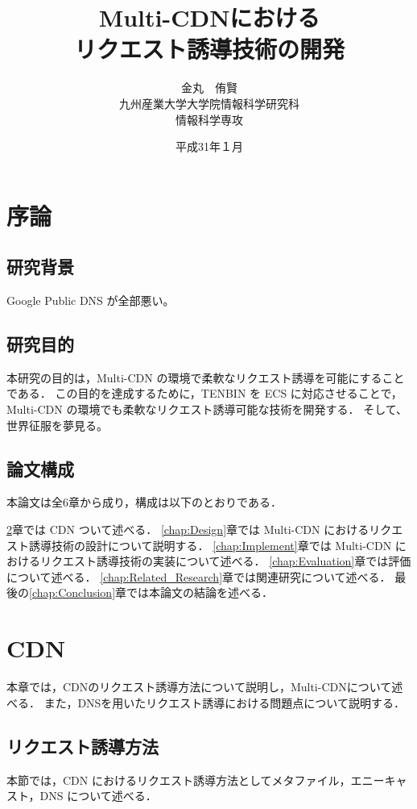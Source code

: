 \documentclass[a4j,12pt,onecolumn,oneside,titlepage,openany,final]{jreport}
\title{
 \Huge{Multi-CDNにおける}\\
 \Huge{リクエスト誘導技術の開発}
 \vspace{5.5cm}\\
}
\author{\LARGE{金丸　侑賢}\vspace{2cm}\\
\LARGE{九州産業大学大学院情報科学研究科}\vspace{0.5cm}\\
\LARGE{情報科学専攻}\vspace{1cm}\\
}
\date{\LARGE{平成31年１月}}
\begin{document}
\maketitle
\tableofcontents
\listoffigures
\listoftables

\chapter{序論}\label{chap:Prologue}

\section{研究背景}
Google Public DNS が全部悪い。
 
\section{研究目的}
本研究の目的は，Multi-CDN の環境で柔軟なリクエスト誘導を可能にすることである．
この目的を達成するために，TENBIN を ECS に対応させることで，Multi-CDN の環境でも柔軟なリクエスト誘導可能な技術を開発する．
そして、世界征服を夢見る。

\section{論文構成}
 本論文は全6章から成り，構成は以下のとおりである．
   
 \ref{chap:CDN}章では CDN ついて述べる．
 \ref{chap:Design}章では Multi-CDN におけるリクエスト誘導技術の設計について説明する．
 \ref{chap:Implement}章では Multi-CDN におけるリクエスト誘導技術の実装について述べる．
 \ref{chap:Evaluation}章では評価について述べる．
 \ref{chap:Related_Research}章では関連研究について述べる．
 最後の\ref{chap:Conclusion}章では本論文の結論を述べる．


\chapter{CDN}\label{chap:CDN}
本章では，CDNのリクエスト誘導方法について説明し，Multi-CDNについて述べる．
また，DNSを用いたリクエスト誘導における問題点について説明する．

\section{リクエスト誘導方法}
本節では，CDN におけるリクエスト誘導方法としてメタファイル，エニーキャスト，DNS について述べる．
\end{document}
